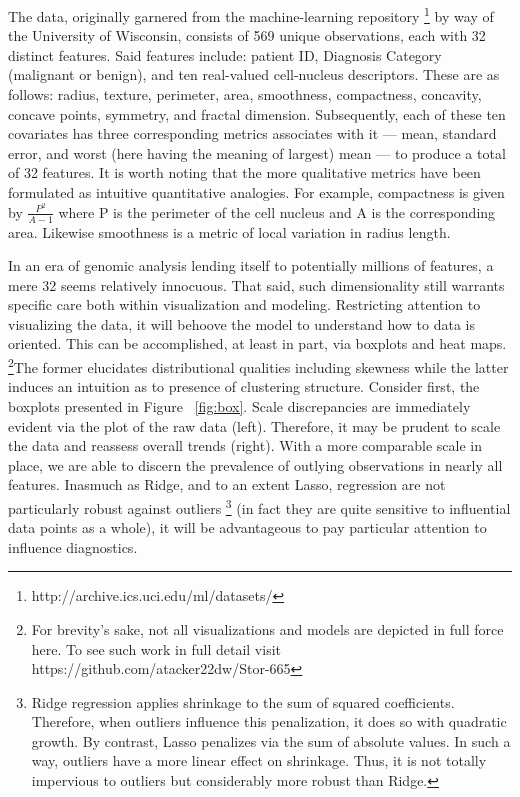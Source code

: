 \documentclass[11pt]{article}
\begin{document}
The data, originally garnered from the machine-learning repository \footnote{http://archive.ics.uci.edu/ml/datasets/} by way of the University of Wisconsin, consists of 569 unique observations, each with 32 distinct features.  Said features include:  patient ID, Diagnosis Category (malignant or benign), and ten real-valued cell-nucleus descriptors.  These are as follows: radius, texture, perimeter, area, smoothness, compactness, concavity, concave points, symmetry, and fractal dimension.  Subsequently, each of these ten covariates has three corresponding metrics associates with it — mean, standard error, and worst (here having the meaning of largest) mean — to produce a total of 32 features.  It is worth noting that the more qualitative metrics have been formulated as intuitive quantitative analogies.  For example, compactness is given by $\frac{P^2}{A-1}$ where P is the perimeter of the cell nucleus and A is the corresponding area.  Likewise smoothness is a metric of local variation in radius length.  

	
	In an era of genomic analysis lending itself to potentially millions of features, a mere 32 seems relatively innocuous.  That said, such dimensionality still warrants specific care both within visualization and modeling.  Restricting attention to visualizing the data, it will behoove the model to understand how to data is oriented.  This can be accomplished, at least in part, via boxplots and heat maps.  \footnote{For brevity's sake, not all visualizations and models are depicted in full force here.  To see such work in full detail visit https://github.com/atacker22dw/Stor-665}The former elucidates distributional qualities including skewness while the latter induces an intuition as to presence of clustering structure.  Consider first, the boxplots presented in Figure 	~\ref{fig:box}.  Scale discrepancies are immediately evident via the plot of the raw data (left).  Therefore, it may be prudent to scale the data and reassess overall trends (right).  With a more comparable scale in place, we are able to discern the prevalence of outlying observations in nearly all features.  Inasmuch as Ridge, and to an extent Lasso, regression are not particularly robust against outliers \footnote {Ridge regression applies shrinkage to the sum of squared coefficients.  Therefore, when outliers influence this penalization, it does so with quadratic growth.  By contrast, Lasso penalizes via the sum of absolute values.  In such a way, outliers have a more linear effect on shrinkage.  Thus, it is not totally impervious to outliers but considerably more robust than Ridge.} (in fact they are quite sensitive to influential data points as a whole), it will be advantageous to pay particular attention to influence diagnostics.  
	
\end{document}
